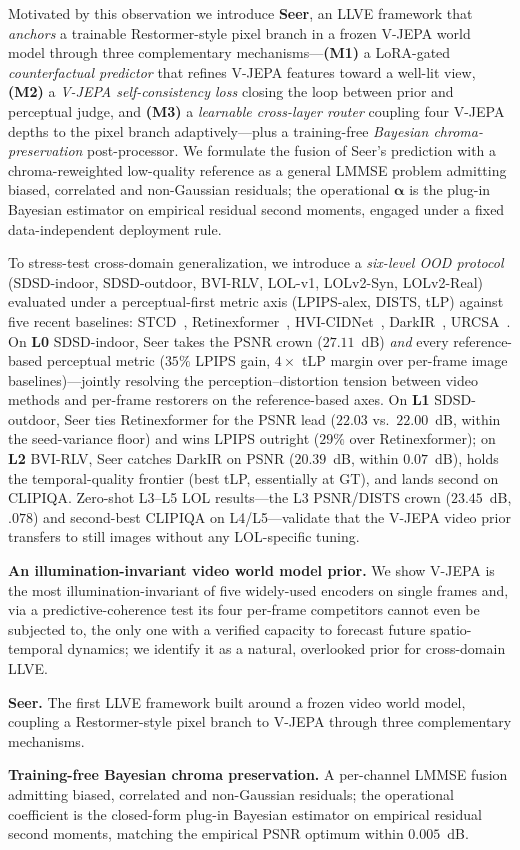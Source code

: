 Motivated by this observation we introduce \textbf{Seer}, an LLVE framework that \emph{anchors} a trainable Restormer-style pixel branch in a frozen V-JEPA world model through three complementary mechanisms---\textbf{(M1)} a LoRA-gated \emph{counterfactual predictor} that refines V-JEPA features toward a well-lit view, \textbf{(M2)} a \emph{V-JEPA self-consistency loss} closing the loop between prior and perceptual judge, and \textbf{(M3)} a \emph{learnable cross-layer router} coupling four V-JEPA depths to the pixel branch adaptively---plus a training-free \emph{Bayesian chroma-preservation} post-processor. We formulate the fusion of Seer's prediction with a chroma-reweighted low-quality reference as a general LMMSE problem admitting biased, correlated and non-Gaussian residuals; the operational $\boldsymbol{\alpha}$ is the plug-in Bayesian estimator on empirical residual second moments, engaged under a fixed data-independent deployment rule.

To stress-test cross-domain generalization, we introduce a \emph{six-level OOD protocol} (SDSD-indoor, SDSD-outdoor, BVI-RLV, LOL-v1, LOLv2-Syn, LOLv2-Real) evaluated under a perceptual-first metric axis (LPIPS-alex, DISTS, tLP) against five recent baselines: STCD~\citep{stcd2025}, Retinexformer~\citep{retinexformer}, HVI-CIDNet~\citep{hvi_cidnet}, DarkIR~\citep{darkir}, URCSA~\citep{urcsa}. On \textbf{L0} SDSD-indoor, Seer takes the PSNR crown ($27.11$~dB) \emph{and} every reference-based perceptual metric ($35\%$ LPIPS gain, $4\times$ tLP margin over per-frame image baselines)---jointly resolving the perception--distortion tension between video methods and per-frame restorers on the reference-based axes. On \textbf{L1} SDSD-outdoor, Seer ties Retinexformer for the PSNR lead ($22.03$ vs.\ $22.00$~dB, within the seed-variance floor) and wins LPIPS outright ($29\%$ over Retinexformer); on \textbf{L2} BVI-RLV, Seer catches DarkIR on PSNR ($20.39$~dB, within $0.07$~dB), holds the temporal-quality frontier (best tLP, essentially at GT), and lands second on CLIPIQA. Zero-shot L3--L5 LOL results---the L3 PSNR/DISTS crown ($23.45$~dB, $.078$) and second-best CLIPIQA on L4/L5---validate that the V-JEPA video prior transfers to still images without any LOL-specific tuning.

\noindent\textbf{An illumination-invariant video world model prior.} We show V-JEPA is the most illumination-invariant of five widely-used encoders on single frames and, via a predictive-coherence test its four per-frame competitors cannot even be subjected to, the only one with a verified capacity to forecast future spatio-temporal dynamics; we identify it as a natural, overlooked prior for cross-domain LLVE.

\noindent\textbf{Seer.} The first LLVE framework built around a frozen video world model, coupling a Restormer-style pixel branch to V-JEPA through three complementary mechanisms.

\noindent\textbf{Training-free Bayesian chroma preservation.} A per-channel LMMSE fusion admitting biased, correlated and non-Gaussian residuals; the operational coefficient is the closed-form plug-in Bayesian estimator on empirical residual second moments, matching the empirical PSNR optimum within $0.005$~dB.
